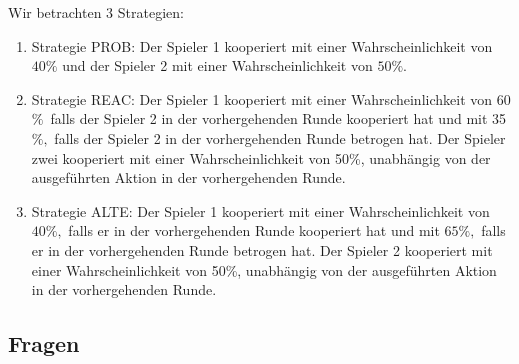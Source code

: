 \documentclass[12pt,a4paper]{article}
\begin{document}
Wir betrachten 3 Strategien:
\begin{enumerate}
\item Strategie PROB: Der Spieler 1 kooperiert mit einer Wahrscheinlichkeit von $40\%$ und der Spieler 
2 mit einer Wahrscheinlichkeit von $50\%$. 
\item Strategie REAC: Der Spieler 1 kooperiert mit einer Wahrscheinlichkeit von 60$\%\,$ falls der
Spieler 2 in der vorhergehenden Runde kooperiert hat und mit 35$\%,$ falls der Spieler 2 in der vorhergehenden Runde betrogen hat.
Der Spieler zwei kooperiert mit einer Wahrscheinlichkeit von 50\%, unabhängig von der ausgeführten Aktion in der vorhergehenden Runde.
\item Strategie ALTE: Der Spieler 1 kooperiert mit einer Wahrscheinlichkeit von $40\%,$ falls er in der
vorhergehenden Runde kooperiert hat und mit $65\%,$ falls er in der vorhergehenden Runde betrogen hat. Der Spieler 2 kooperiert mit einer Wahrscheinlichkeit von 50\%, unabhängig von der ausgeführten Aktion in der vorhergehenden Runde.
\end{enumerate}


\subsection*{Fragen}
\end{document}
